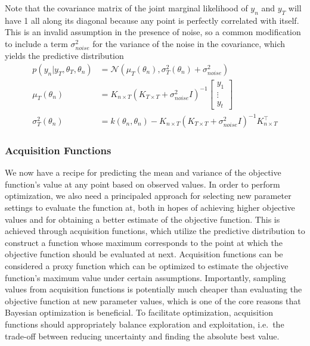 Note that the covariance matrix of the joint marginal likelihood of $y_n$ and $y_T$ will have 1 all along its diagonal because any point is perfectly correlated with itself.
This is an invalid assumption in the presence of noise, so a common modification to include a term $\sigma_{noise}^2$ for the variance of the noise in the covariance, which yields the predictive distribution
\begin{align}
        p(y_{n} | y_T, \theta_T, \theta_n) &= \mathcal{N}(\mu_T(\theta_n), \sigma_T^2(\theta_n) + \sigma_{noise}^2)\\
        \mu_T(\theta_n) &= K_{n \times T} (K_{T \times T} + \sigma_{noise}^2I)^{-1} \begin{bmatrix}
                y_1 \\
                \vdots \\
                y_t
        \end{bmatrix} \\
        \sigma_T^2(\theta_n) &= k(\theta_n, \theta_n) - K_{n \times T} (K_{T \times T} + \sigma_{noise}^2I)^{-1} K_{n \times T}^\top
\end{align}

\subsubsection{Acquisition Functions}

We now have a recipe for predicting the mean and variance of the objective function's value at any point based on observed values.
In order to perform optimization, we also need a principaled approach for selecting new parameter settings to evaluate the function at, both in hopes of achieving higher objective values and for obtaining a better estimate of the objective function.
This is achieved through acquisition functions, which utilize the predictive distribution to construct a function whose maximum corresponds to the point at which the objective function should be evaluated at next.
Acquisition functions can be considered a proxy function which can be optimized to estimate the objective function's maximum value under certain assumptions.
Importantly, sampling values from acquisition functions is potentially much cheaper than evaluating the objective function at new parameter values, which is one of the core reasons that Bayesian optimization is beneficial.
To facilitate optimization, acquisition functions should appropriately balance exploration and exploitation, i.e.\ the trade-off between reducing uncertainty and finding the absolute best value.

